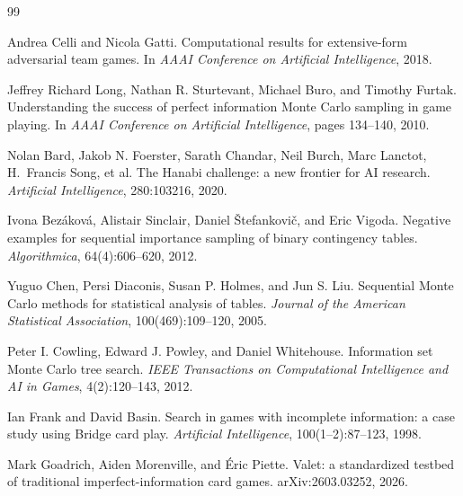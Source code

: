 \documentclass[11pt,letterpaper]{article}
\begin{document}
\begin{thebibliography}{99}

Andrea Celli and Nicola Gatti.
\newblock Computational results for extensive-form adversarial team games.
\newblock In \emph{AAAI Conference on Artificial Intelligence}, 2018.

Jeffrey Richard Long, Nathan R. Sturtevant, Michael Buro, and Timothy Furtak.
\newblock Understanding the success of perfect information Monte Carlo sampling
in game playing.
\newblock In \emph{AAAI Conference on Artificial Intelligence}, pages 134--140,
2010.

Nolan Bard, Jakob N. Foerster, Sarath Chandar, Neil Burch, Marc Lanctot,
H.~Francis Song, et al.
\newblock The Hanabi challenge: a new frontier for AI research.
\newblock \emph{Artificial Intelligence}, 280:103216, 2020.

Ivona Bez\'akov\'a, Alistair Sinclair, Daniel \v{S}tefankovi\v{c}, and Eric
Vigoda.
\newblock Negative examples for sequential importance sampling of binary
contingency tables.
\newblock \emph{Algorithmica}, 64(4):606--620, 2012.

Yuguo Chen, Persi Diaconis, Susan P. Holmes, and Jun S. Liu.
\newblock Sequential Monte Carlo methods for statistical analysis of tables.
\newblock \emph{Journal of the American Statistical Association},
100(469):109--120, 2005.

Peter I. Cowling, Edward J. Powley, and Daniel Whitehouse.
\newblock Information set Monte Carlo tree search.
\newblock \emph{IEEE Transactions on Computational Intelligence and AI in
Games}, 4(2):120--143, 2012.

Ian Frank and David Basin.
\newblock Search in games with incomplete information: a case study using Bridge
card play.
\newblock \emph{Artificial Intelligence}, 100(1--2):87--123, 1998.

Mark Goadrich, Aiden Morenville, and \'Eric Piette.
\newblock Valet: a standardized testbed of traditional imperfect-information
card games.
\newblock arXiv:2603.03252, 2026.


\end{thebibliography}
\end{document}

